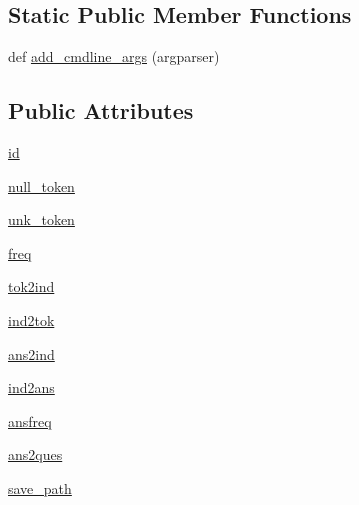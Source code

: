 \subsection*{Static Public Member Functions}
\begin{DoxyCompactItemize}
\item 
def \hyperlink{classparlai_1_1tasks_1_1vqa__v1_1_1agents_1_1VqaDictionaryAgent_a77cb7a0b3e0fbbec04905a9745f95dd7}{add\+\_\+cmdline\+\_\+args} (argparser)
\end{DoxyCompactItemize}
\subsection*{Public Attributes}
\begin{DoxyCompactItemize}
\item 
\hyperlink{classparlai_1_1tasks_1_1vqa__v1_1_1agents_1_1VqaDictionaryAgent_a91f3e9070c98389aa082ac35481da54e}{id}
\item 
\hyperlink{classparlai_1_1tasks_1_1vqa__v1_1_1agents_1_1VqaDictionaryAgent_af308d5a88da2f1dee49ffab0d50f7769}{null\+\_\+token}
\item 
\hyperlink{classparlai_1_1tasks_1_1vqa__v1_1_1agents_1_1VqaDictionaryAgent_a96b51ba936dc32fbd8d8d297fb159b48}{unk\+\_\+token}
\item 
\hyperlink{classparlai_1_1tasks_1_1vqa__v1_1_1agents_1_1VqaDictionaryAgent_accaadbb9068cda791a1a2068bf54ef92}{freq}
\item 
\hyperlink{classparlai_1_1tasks_1_1vqa__v1_1_1agents_1_1VqaDictionaryAgent_af2ddcdf09380fd807feeb5ec0cfecc94}{tok2ind}
\item 
\hyperlink{classparlai_1_1tasks_1_1vqa__v1_1_1agents_1_1VqaDictionaryAgent_aede277ee9bd0898104da59736bc248f4}{ind2tok}
\item 
\hyperlink{classparlai_1_1tasks_1_1vqa__v1_1_1agents_1_1VqaDictionaryAgent_a797678a7e21845c631c4953ba41b6238}{ans2ind}
\item 
\hyperlink{classparlai_1_1tasks_1_1vqa__v1_1_1agents_1_1VqaDictionaryAgent_ae11eca250a8c26cdae4f55f8a654d645}{ind2ans}
\item 
\hyperlink{classparlai_1_1tasks_1_1vqa__v1_1_1agents_1_1VqaDictionaryAgent_a9329ab559fc0c5df702345f5c96d7001}{ansfreq}
\item 
\hyperlink{classparlai_1_1tasks_1_1vqa__v1_1_1agents_1_1VqaDictionaryAgent_afbea42cd76614c991aa453fdf12417d1}{ans2ques}
\item 
\hyperlink{classparlai_1_1tasks_1_1vqa__v1_1_1agents_1_1VqaDictionaryAgent_a9d23631bb29ba217e0fb870cce60c622}{save\+\_\+path}
\end{DoxyCompactItemize}


